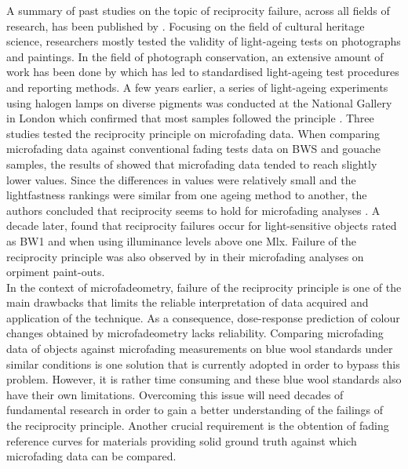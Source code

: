 A summary of past studies on the topic of reciprocity failure, across all fields of research, has been published by \citet{martin_reciprocity_2003}. Focusing on the field of cultural heritage science, researchers mostly tested the validity of light-ageing tests on photographs and paintings. In the field of photograph conservation, an extensive amount of work has been done by \citet[Chapters 2 and 3]{wilhelm_permanence_2003} which has led to standardised light-ageing test procedures and reporting methods. A few years earlier, a series of light-ageing experiments using halogen lamps on diverse pigments was conducted at the National Gallery in London which confirmed that most samples followed the principle \citep[89]{saunders_light-induced_1996}. Three studies tested the reciprocity principle on microfading data. When comparing microfading data against conventional fading tests data on \gls{BWS} and gouache samples, the results of \citet{whitmore_predicting_1999} showed that microfading data tended to reach slightly lower \dEab values. Since the differences in \dEab values were relatively small and the lightfastness rankings were similar from one ageing method to another, the authors concluded that reciprocity seems to hold for microfading analyses \citep[404]{whitmore_predicting_1999}. A decade later, \citet{del_hoyo-melendez_investigation_2011} found that reciprocity failures occur for light-sensitive objects rated as BW1 and when using illuminance levels above one \unit{\mega\lux}. Failure of the reciprocity principle was also observed by \citet{liang_development_2011} in their microfading analyses on orpiment paint-outs.\\ 

In the context of microfadeometry, failure of the reciprocity principle is one of the main drawbacks that limits the reliable interpretation of data acquired and application of the technique. As a consequence, dose-response prediction of colour changes obtained by microfadeometry lacks reliability. Comparing microfading data of objects against microfading measurements on blue wool standards under similar conditions is one solution that is currently adopted in order to bypass this problem. However, it is rather time consuming and these blue wool standards also have their own limitations. Overcoming this issue will need decades of fundamental research in order to gain a better understanding of the failings of the reciprocity principle. Another crucial requirement is the obtention of fading reference curves for materials providing solid ground truth against which microfading data can be compared.\\


